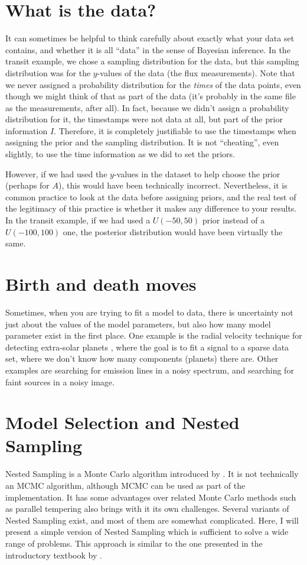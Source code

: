 \section{What is the data?}
It can sometimes be helpful to think carefully about exactly what your data set
contains, and whether it is all ``data'' in the sense of Bayesian inference.
In the transit example, we chose a sampling distribution for the data, but this
sampling distribution was for the $y$-values of the data
(the flux measurements). Note that we never assigned a probability distribution
for the {\it times} of the data points, even though we might think of that as
part of the data (it's probably in the same file as the measurements, after all).
In fact, because we didn't assign a probability distribution for it, the
timestamps were not data at all, but part of the prior information $I$.
Therefore, it is completely justifiable to use the timestamps when assigning
the prior and the sampling distribution. It is not ``cheating'', even slightly,
to use the time information as we did to set the priors.

However, if we had used the $y$-values in the dataset to help choose the prior
(perhaps for $A$), this would have been technically incorrect. Nevertheless,
it is common practice to look at the data before assigning priors, and the
real test of the legitimacy of this practice is whether it makes any difference
to your results. In the transit example, if we had used a $U(-50, 50)$ prior
instead of a $U(-100, 100)$ one, the posterior distribution would have been
virtually the same.



\section{Birth and death moves}
Sometimes, when you are trying to fit a model to data, there is uncertainty
not just about the values of the model parameters, but also how many model
parameter exist in the first place. One example is
the radial velocity technique for detecting extra-solar planets
\citep{gregory}, where the goal is to fit a signal to a sparse data set, where
we don't know how many components (planets) there are. Other examples are
searching for emission lines in a noisy spectrum, and searching for faint
sources in a noisy image.



\section{Model Selection and Nested Sampling}
Nested Sampling is a Monte Carlo algorithm introduced by \citet{skilling}. It
is not technically an MCMC algorithm, although MCMC can be used as part of the
implementation. It has some advantages over related Monte Carlo methods
such as parallel tempering \citep{pt, gregory, tempering}
also brings with it its own challenges.
Several variants of Nested Sampling exist, and most of them are somewhat
complicated. Here, I will present a simple version of Nested Sampling which
is sufficient to solve a wide range of problems. This approach is similar to
the one presented in the introductory textbook by \citet{sivia}.


